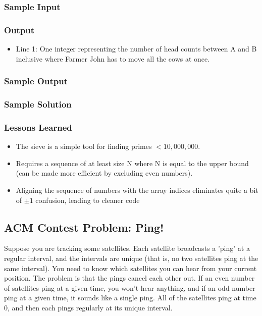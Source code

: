 \subsubsection{Sample Input}

\subsubsection{Output}
\begin{itemize}
	\item Line 1: One integer representing the number of head counts between A and B inclusive where Farmer John has to move all the cows at once.
\end{itemize}

\subsubsection{Sample Output}

\subsubsection{Sample Solution}

\subsubsection{Lessons Learned}
\begin{itemize}
	\item The sieve is a simple tool for finding primes $<10,000,000$.
	\item Requires a sequence of at least size N where N is equal to the upper bound (can be made more efficient by excluding even numbers).
	\item Aligning the sequence of numbers with the array indices eliminates quite a bit of $\pm1$ confusion, leading to cleaner code
\end{itemize}

\subsection{ACM Contest Problem: Ping!\cite{acmsoutheastregional2013}}
Suppose you are tracking some satellites.
Each satellite broadcasts a 'ping' at a regular interval, and the intervals are unique (that is, no two satellites ping at the same interval).
You need to know which satellites you can hear from your current position.
The problem is that the pings cancel each other out.
If an even number of satellites ping at a given time, you won't hear anything, and if an odd number ping at a given time, it sounds like a single ping.
All of the satellites ping at time 0, and then each pings regularly at its unique interval.

